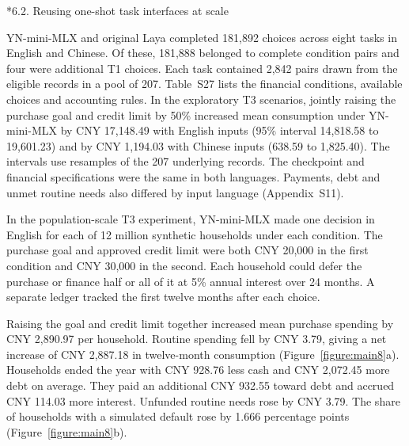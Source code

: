 \documentclass[10pt]{article}
\makeatletter
\renewcommand\subsection{\@startsection{subsection}{2}{\z@}{-1.7ex plus -.5ex minus -.2ex}{.6ex plus .2ex}{\normalfont\normalsize\mdseries}}
\makeatother
\begin{document}
\subsection*{6.2. Reusing one-shot task interfaces at scale}

YN-mini-MLX and original Laya completed 181,892 choices across eight tasks in English and Chinese. Of these, 181,888 belonged to complete condition pairs and four were additional T1 choices. Each task contained 2,842 pairs drawn from the eligible records in a pool of 207. Table~S27 lists the financial conditions, available choices and accounting rules. In the exploratory T3 scenarios, jointly raising the purchase goal and credit limit by 50\% increased mean consumption under YN-mini-MLX by CNY 17,148.49 with English inputs (95\% interval 14,818.58 to 19,601.23) and by CNY 1,194.03 with Chinese inputs (638.59 to 1,825.40). The intervals use resamples of the 207 underlying records. The checkpoint and financial specifications were the same in both languages. Payments, debt and unmet routine needs also differed by input language (Appendix~S11).

In the population-scale T3 experiment, YN-mini-MLX made one decision in English for each of 12 million synthetic households under each condition. The purchase goal and approved credit limit were both CNY 20,000 in the first condition and CNY 30,000 in the second. Each household could defer the purchase or finance half or all of it at 5\% annual interest over 24 months. A separate ledger tracked the first twelve months after each choice.

Raising the goal and credit limit together increased mean purchase spending by CNY 2,890.97 per household. Routine spending fell by CNY 3.79, giving a net increase of CNY 2,887.18 in twelve-month consumption (Figure~\ref{figure:main8}a). Households ended the year with CNY 928.76 less cash and CNY 2,072.45 more debt on average. They paid an additional CNY 932.55 toward debt and accrued CNY 114.03 more interest. Unfunded routine needs rose by CNY 3.79. The share of households with a simulated default rose by 1.666 percentage points (Figure~\ref{figure:main8}b).
\end{document}
